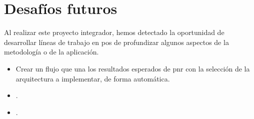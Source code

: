 \section{Desafíos futuros}
Al realizar este proyecto integrador, hemos detectado la oportunidad de desarrollar líneas de trabajo en pos de profundizar algunos aspectos de la metodología o de la aplicación.  
\begin{itemize}
\item Crear un flujo que una los resultados esperados de \gls{pnr} con la selección de la arquitectura a implementar, de forma automática.
\item .
\item .
\end{itemize}






